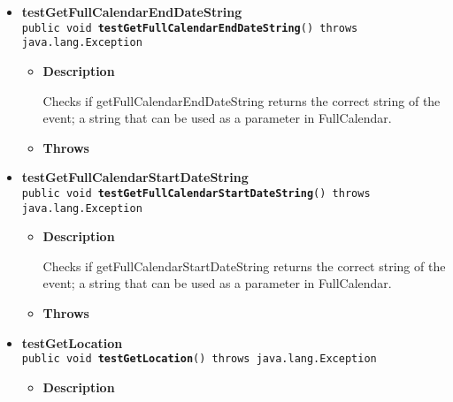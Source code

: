 \documentclass[11pt,a4paper]{report}
\begin{document}
{{{\begin{itemize}
{\begin{itemize}
{Checks if getEnd returns the correct date.
}
\item{{\bf  Throws}
}%
\end{itemize}
}%
\item{ 
{\bf  testGetFullCalendarEndDateString}\\
\texttt{public void\ {\bf  testGetFullCalendarEndDateString}() throws java.lang.Exception
\label{is.mpg.ruglan.test.CalEventTest.testGetFullCalendarEndDateString()}}%
\begin{itemize}
\item{
{\bf  Description}

Checks if getFullCalendarEndDateString returns the correct string of the event; a string that can be used as a parameter in FullCalendar.
}
\item{{\bf  Throws}
}%
\end{itemize}
}%
\item{ 
{\bf  testGetFullCalendarStartDateString}\\
\texttt{public void\ {\bf  testGetFullCalendarStartDateString}() throws java.lang.Exception
\label{is.mpg.ruglan.test.CalEventTest.testGetFullCalendarStartDateString()}}%
\begin{itemize}
\item{
{\bf  Description}

Checks if getFullCalendarStartDateString returns the correct string of the event; a string that can be used as a parameter in FullCalendar.
}
\item{{\bf  Throws}
}%
\end{itemize}
}%
\item{ 
{\bf  testGetLocation}\\
\texttt{public void\ {\bf  testGetLocation}() throws java.lang.Exception
\label{is.mpg.ruglan.test.CalEventTest.testGetLocation()}}%
\begin{itemize}
\item{
{\bf  Description}

}
\end{itemize}}
\end{itemize}}}}
\end{document}
